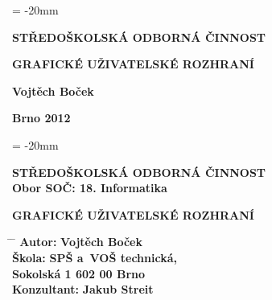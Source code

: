 \documentclass[12pt, a4paper, oneside]{article}
\newcommand{\B}{\textbf} %
\begin{document}

\pagestyle{empty} %
 
\voffset = -20mm %
\enlargethispage{60mm} %

\begin{center}
 
\Large \B{STŘEDOŠKOLSKÁ ODBORNÁ ČINNOST}

\vspace{60mm}

\huge %
\B{GRAFICKÉ UŽIVATELSKÉ ROZHRANÍ} 

\Large

\vspace{90mm}


\B{Vojtěch Boček} \\

\vspace{40mm}

\B{Brno 2012}


\end{center}

\newpage %

\voffset = -20mm %
\enlargethispage{60mm} %

\begin{center}

\Large \B{STŘEDOŠKOLSKÁ ODBORNÁ ČINNOST}  \\
\vspace{10mm}
 \normalsize 
\B{Obor SOČ: 18. Informatika}%

\vspace{45mm}

\LARGE %
\B{GRAFICKÉ UŽIVATELSKÉ ROZHRANÍ} 
\end{center}  
\large

\vspace{50mm}


\begin{tabbing}
\hspace{10mm} \= \hspace{30mm}  \=   \kill %
  \> \B{Autor:}  \> \B{Vojtěch Boček}        \\[8mm] 
  \> \B{Škola:}   \> \B{SPŠ a~VOŠ technická, }     \\
  \>              \> \B{Sokolská 1 602 00 Brno}    \\[8mm]

  \> \B{Konzultant:} \> \B {Jakub Streit} 
\end{tabbing}
\end{document}
